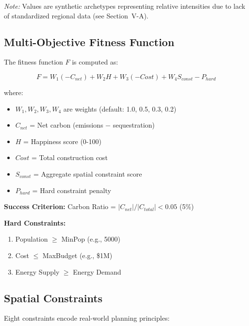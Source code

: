 \documentclass[conference]{IEEEtran}
\begin{document}
\textit{Note:} Values are synthetic archetypes representing relative intensities due to lack of standardized regional data (see Section~V-A).

\subsection{Multi-Objective Fitness Function}

The fitness function $F$ is computed as:

\begin{equation}
F = W_1(-C_{net}) + W_2 H + W_3(-Cost) + W_4 S_{const} - P_{hard}
\end{equation}

where:
\begin{itemize}
    \item $W_1, W_2, W_3, W_4$ are weights (default: 1.0, 0.5, 0.3, 0.2)
    \item $C_{net}$ = Net carbon (emissions $-$ sequestration)
    \item $H$ = Happiness score (0-100)
    \item $Cost$ = Total construction cost
    \item $S_{const}$ = Aggregate spatial constraint score
    \item $P_{hard}$ = Hard constraint penalty
\end{itemize}

\textbf{Success Criterion:} Carbon Ratio = $|C_{net}| / |C_{total}| < 0.05$ (5\%)

\textbf{Hard Constraints:}
\begin{enumerate}
    \item Population $\geq$ MinPop (e.g., 5000)
    \item Cost $\leq$ MaxBudget (e.g., \$1M)
    \item Energy Supply $\geq$ Energy Demand
\end{enumerate}

\subsection{Spatial Constraints}

Eight constraints encode real-world planning principles:
\end{document}

